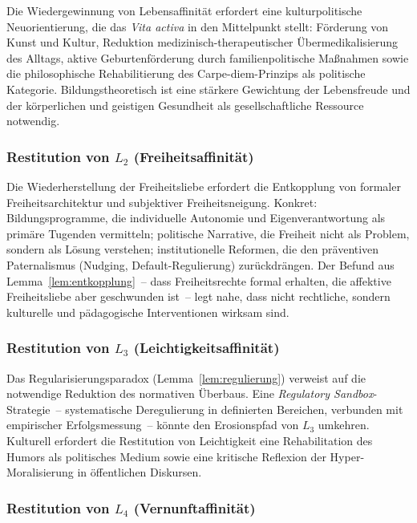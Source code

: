 ﻿\documentclass[a4paper,12pt]{article}
\theoremstyle{definition}
\begin{document}
Die Wiedergewinnung von Lebensaffinität erfordert eine kulturpolitische Neuorientierung, die das \emph{Vita activa} in den Mittelpunkt stellt: Förderung von Kunst und Kultur, Reduktion medizinisch-therapeutischer Übermedikalisierung des Alltags, aktive Geburtenförderung durch familienpolitische Maßnahmen sowie die philosophische Rehabilitierung des Carpe-diem-Prinzips als politische Kategorie. Bildungstheoretisch ist eine stärkere Gewichtung der Lebensfreude und der körperlichen und geistigen Gesundheit als gesellschaftliche Ressource notwendig.

\subsubsection{Restitution von $L_2$ (Freiheitsaffinität)}

Die Wiederherstellung der Freiheitsliebe erfordert die Entkopplung von formaler Freiheitsarchitektur und subjektiver Freiheitsneigung. Konkret: Bildungsprogramme, die individuelle Autonomie und Eigenverantwortung als primäre Tugenden vermitteln; politische Narrative, die Freiheit nicht als Problem, sondern als Lösung verstehen; institutionelle Reformen, die den präventiven Paternalismus (Nudging, Default-Regulierung) zurückdrängen. Der Befund aus Lemma~\ref{lem:entkopplung}~-- dass Freiheitsrechte formal erhalten, die affektive Freiheitsliebe aber geschwunden ist~-- legt nahe, dass nicht rechtliche, sondern kulturelle und pädagogische Interventionen wirksam sind.

\subsubsection{Restitution von $L_3$ (Leichtigkeitsaffinität)}

Das Regularisierungsparadox (Lemma~\ref{lem:regulierung}) verweist auf die notwendige Reduktion des normativen Überbaus. Eine \emph{Regulatory Sandbox}-Strategie~-- systematische Deregulierung in definierten Bereichen, verbunden mit empirischer Erfolgsmessung~-- könnte den Erosionspfad von $L_3$ umkehren. Kulturell erfordert die Restitution von Leichtigkeit eine Rehabilitation des Humors als politisches Medium sowie eine kritische Reflexion der Hyper-Moralisierung in öffentlichen Diskursen.

\subsubsection{Restitution von $L_4$ (Vernunftaffinität)}
\end{document}
